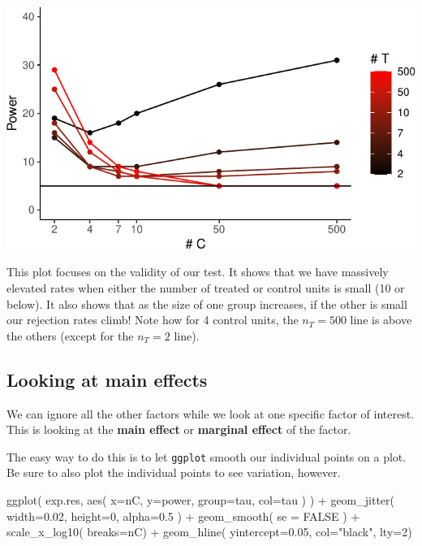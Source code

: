 \documentclass[
]{book}
\newenvironment{Shaded}{\begin{snugshade}}{\end{snugshade}}
\newcommand{\AttributeTok}[1]{\textcolor[rgb]{0.77,0.63,0.00}{#1}}
\newcommand{\ConstantTok}[1]{\textcolor[rgb]{0.00,0.00,0.00}{#1}}
\newcommand{\DecValTok}[1]{\textcolor[rgb]{0.00,0.00,0.81}{#1}}
\newcommand{\FloatTok}[1]{\textcolor[rgb]{0.00,0.00,0.81}{#1}}
\newcommand{\FunctionTok}[1]{\textcolor[rgb]{0.00,0.00,0.00}{#1}}
\newcommand{\NormalTok}[1]{#1}
\newcommand{\SpecialCharTok}[1]{\textcolor[rgb]{0.00,0.00,0.00}{#1}}
\newcommand{\StringTok}[1]{\textcolor[rgb]{0.31,0.60,0.02}{#1}}
\begin{document}
\begin{center}\includegraphics[width=0.75\linewidth]{Designing-Simulations-in-R_files/figure-latex/plot_interaction_Results-1} \end{center}

This plot focuses on the validity of our test.
It shows that we have massively elevated rates when either the number of treated or control units is small (10 or below).
It also shows that as the size of one group increases, if the other is small our rejection rates climb! Note how for 4 control units, the \(n_T = 500\) line is above the others (except for the \(n_T = 2\) line).

\hypertarget{looking-at-main-effects}{%
\subsection{Looking at main effects}\label{looking-at-main-effects}}

We can ignore all the other factors while we look at one specific factor of interest.
This is looking at the \textbf{main effect} or \textbf{marginal effect} of the factor.

The easy way to do this is to let \texttt{ggplot} smooth our individual points on a
plot. Be sure to also plot the individual points to see variation, however.

\begin{Shaded}
\begin{Highlighting}[]
\FunctionTok{ggplot}\NormalTok{( exp.res, }\FunctionTok{aes}\NormalTok{( }\AttributeTok{x=}\NormalTok{nC, }\AttributeTok{y=}\NormalTok{power, }\AttributeTok{group=}\NormalTok{tau, }\AttributeTok{col=}\NormalTok{tau ) ) }\SpecialCharTok{+}
  \FunctionTok{geom\_jitter}\NormalTok{( }\AttributeTok{width=}\FloatTok{0.02}\NormalTok{, }\AttributeTok{height=}\DecValTok{0}\NormalTok{, }\AttributeTok{alpha=}\FloatTok{0.5}\NormalTok{ ) }\SpecialCharTok{+}
  \FunctionTok{geom\_smooth}\NormalTok{( }\AttributeTok{se =} \ConstantTok{FALSE}\NormalTok{ ) }\SpecialCharTok{+}
  \FunctionTok{scale\_x\_log10}\NormalTok{( }\AttributeTok{breaks=}\NormalTok{nC) }\SpecialCharTok{+}
  \FunctionTok{geom\_hline}\NormalTok{( }\AttributeTok{yintercept=}\FloatTok{0.05}\NormalTok{, }\AttributeTok{col=}\StringTok{"black"}\NormalTok{, }\AttributeTok{lty=}\DecValTok{2}\NormalTok{)}
\end{Highlighting}
\end{Shaded}
\end{document}
